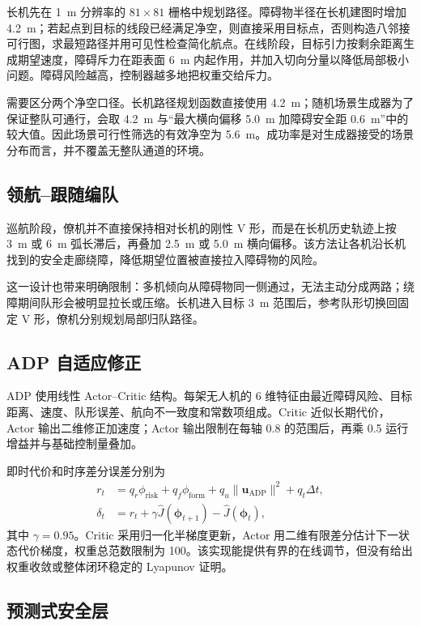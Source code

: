 \documentclass[UTF8,a4paper,12pt,fontset=windows]{ctexart}
\begin{document}
长机先在 \SI{1}{m} 分辨率的 $81\times81$ 栅格中规划路径。障碍物半径在长机建图时增加 \SI{4.2}{m}；若起点到目标的线段已经满足净空，则直接采用目标点，否则构造八邻接可行图，求最短路径并用可见性检查简化航点。在线阶段，目标引力按剩余距离生成期望速度，障碍斥力在距表面 \SI{6}{m} 内起作用，并加入切向分量以降低局部极小问题。障碍风险越高，控制器越多地把权重交给斥力。

需要区分两个净空口径。长机路径规划函数直接使用 \SI{4.2}{m}；随机场景生成器为了保证整队可通行，会取 \SI{4.2}{m} 与“最大横向偏移 \SI{5.0}{m} 加障碍安全距 \SI{0.6}{m}”中的较大值。因此场景可行性筛选的有效净空为 \SI{5.6}{m}。成功率是对生成器接受的场景分布而言，并不覆盖无整队通道的环境。

\subsection{领航--跟随编队}

巡航阶段，僚机并不直接保持相对长机的刚性 V 形，而是在长机历史轨迹上按 \SI{3}{m} 或 \SI{6}{m} 弧长滞后，再叠加 \SI{2.5}{m} 或 \SI{5.0}{m} 横向偏移。该方法让各机沿长机找到的安全走廊绕障，降低期望位置被直接拉入障碍物的风险。

这一设计也带来明确限制：多机倾向从障碍物同一侧通过，无法主动分成两路；绕障期间队形会被明显拉长或压缩。长机进入目标 \SI{3}{m} 范围后，参考队形切换回固定 V 形，僚机分别规划局部归队路径。

\subsection{ADP 自适应修正}

ADP 使用线性 Actor--Critic 结构。每架无人机的 6 维特征由最近障碍风险、目标距离、速度、队形误差、航向不一致度和常数项组成。Critic 近似长期代价，Actor 输出二维修正加速度；Actor 输出限制在每轴 0.8 的范围后，再乘 0.5 运行增益并与基础控制量叠加。

即时代价和时序差分误差分别为
\begin{align}
r_t &= q_r\phi_{\mathrm{risk}}+q_f\phi_{\mathrm{form}}
      +q_u\lVert\bm u_{\mathrm{ADP}}\rVert^2+q_t\Delta t,\\
\delta_t &= r_t+\gamma\widehat J(\bm\phi_{t+1})-\widehat J(\bm\phi_t),
\end{align}
其中 $\gamma=0.95$。Critic 采用归一化半梯度更新，Actor 用二维有限差分估计下一状态代价梯度，权重总范数限制为 100。该实现能提供有界的在线调节，但没有给出权重收敛或整体闭环稳定的 Lyapunov 证明。

\subsection{预测式安全层}
\end{document}
